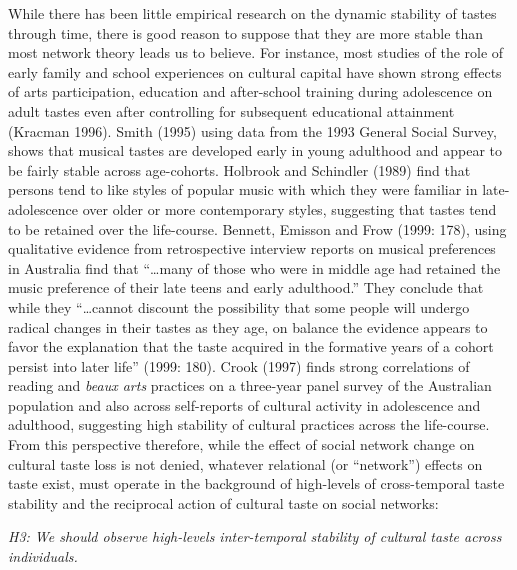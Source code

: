 \documentclass[
]{article}
\begin{document}
While there has been little empirical research on the dynamic stability of tastes through time, there is good reason to suppose that they are more stable than most network theory leads us to believe. For instance, most studies of the role of early family and school experiences on cultural capital have shown strong effects of arts participation, education and after-school training during adolescence on adult tastes even after controlling for subsequent educational attainment (Kracman 1996). Smith (1995) using data from the 1993 General Social Survey, shows that musical tastes are developed early in young adulthood and appear to be fairly stable across age-cohorts. Holbrook and Schindler (1989) find that persons tend to like styles of popular music with which they were familiar in late-adolescence over older or more contemporary styles, suggesting that tastes tend to be retained over the life-course. Bennett, Emisson and Frow (1999: 178), using qualitative evidence from retrospective interview reports on musical preferences in Australia find that ``\ldots many of those who were in middle age had retained the music preference of their late teens and early adulthood.'' They conclude that while they ``\ldots cannot discount the possibility that some people will undergo radical changes in their tastes as they age, on balance the evidence appears to favor the explanation that the taste acquired in the formative years of a cohort persist into later life'' (1999: 180). Crook (1997) finds strong correlations of reading and \emph{beaux arts} practices on a three-year panel survey of the Australian population and also across self-reports of cultural activity in adolescence and adulthood, suggesting high stability of cultural practices across the life-course. From this perspective therefore, while the effect of social network change on cultural taste loss is not denied, whatever relational (or ``network'') effects on taste exist, must operate in the background of high-levels of cross-temporal taste stability and the reciprocal action of cultural taste on social networks:

\emph{H3: We should observe high-levels inter-temporal stability of cultural taste across individuals.}
\end{document}
